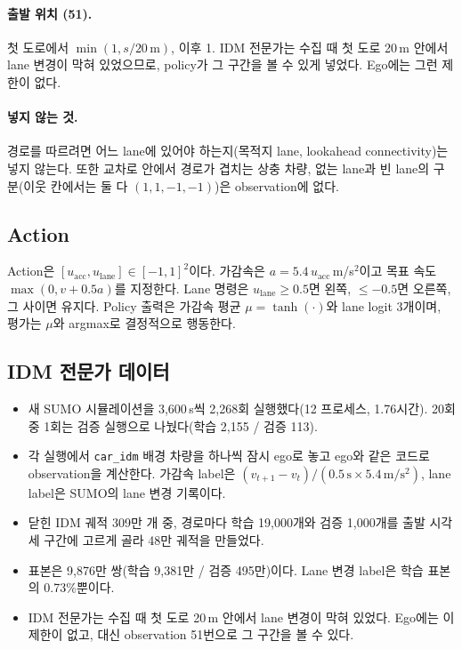\documentclass[10pt,a4paper]{article}
\begin{document}
\paragraph{출발 위치 (51).} 첫 도로에서 $\min(1, s/20\,\mathrm{m})$, 이후 1. IDM 전문가는 수집 때 첫 도로 20\,m 안에서 lane 변경이 막혀 있었으므로, policy가 그 구간을 볼 수 있게 넣었다. Ego에는 그런 제한이 없다.

\paragraph{넣지 않는 것.} 경로를 따르려면 어느 lane에 있어야 하는지(목적지 lane, lookahead connectivity)는 넣지 않는다. 또한 교차로 안에서 경로가 겹치는 상충 차량, 없는 lane과 빈 lane의 구분(이웃 칸에서는 둘 다 $(1,1,-1,-1)$)은 observation에 없다.

\subsection{Action}
Action은 $[u_{\mathrm{acc}}, u_{\mathrm{lane}}] \in [-1,1]^2$이다. 가감속은 $a = 5.4\,u_{\mathrm{acc}}$\,m/s$^2$이고 목표 속도 $\max(0, v + 0.5a)$를 지정한다. Lane 명령은 $u_{\mathrm{lane}} \ge 0.5$면 왼쪽, $\le -0.5$면 오른쪽, 그 사이면 유지다. Policy 출력은 가감속 평균 $\mu=\tanh(\cdot)$와 lane logit 3개이며, 평가는 $\mu$와 argmax로 결정적으로 행동한다.

\subsection{IDM 전문가 데이터}
\begin{itemize}
  \item 새 SUMO 시뮬레이션을 3,600\,s씩 2,268회 실행했다(12 프로세스, 1.76시간). 20회 중 1회는 검증 실행으로 나눴다(학습 2,155 / 검증 113).
  \item 각 실행에서 \texttt{car\_idm} 배경 차량을 하나씩 잠시 ego로 놓고 ego와 같은 코드로 observation을 계산한다. 가감속 label은 $(v_{t+1}-v_t)/(0.5\,\mathrm{s}\times 5.4\,\mathrm{m/s^2})$, lane label은 SUMO의 lane 변경 기록이다.
  \item 닫힌 IDM 궤적 309만 개 중, 경로마다 학습 19,000개와 검증 1,000개를 출발 시각 세 구간에 고르게 골라 48만 궤적을 만들었다.
  \item 표본은 9,876만 쌍(학습 9,381만 / 검증 495만)이다. Lane 변경 label은 학습 표본의 0.73\%뿐이다.
  \item IDM 전문가는 수집 때 첫 도로 20\,m 안에서 lane 변경이 막혀 있었다. Ego에는 이 제한이 없고, 대신 observation 51번으로 그 구간을 볼 수 있다.
\end{itemize}
\end{document}
